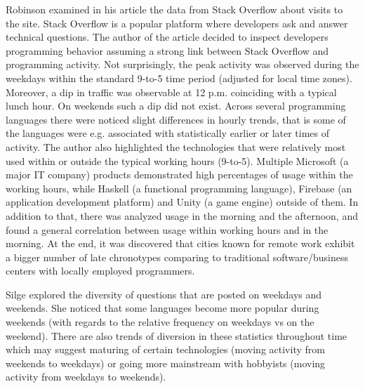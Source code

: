 
Robinson \cite{Rob17LangsUsedAtNight} examined in his article the data from Stack Overflow about visits to the site. Stack Overflow is a popular platform where developers ask and answer technical questions. The author of the article decided to inspect developers programming behavior assuming a strong link between Stack Overflow and programming activity. Not surprisingly, the peak activity was observed during the weekdays within the standard 9-to-5 time period (adjusted for local time zones). Moreover, a dip in traffic was observable at 12 p.m. coinciding with a typical lunch hour. On weekends such a dip did not exist. Across several programming languages there were noticed slight differences in hourly trends, that is some of the languages were e.g. associated with statistically earlier or later times of activity. The author also highlighted the technologies that were relatively most used within or outside the typical working hours (9-to-5). Multiple Microsoft (a major IT company) products demonstrated high percentages of usage within the working hours, while Haskell (a functional programming language), Firebase (an application development platform) and Unity (a game engine) outside of them. In addition to that, there was analyzed usage in the morning and the afternoon, and found a general correlation between usage within working hours and in the morning. At the end, it was discovered that cities known for remote work exhibit a bigger number of late chronotypes comparing to traditional software/business centers with locally employed programmers.

Silge \cite{Sil17LangsUsedOnWeekends} explored the diversity of questions that are posted on weekdays and weekends. She noticed that some languages become more popular during weekends (with regards to the relative frequency on weekdays vs on the weekend). There are also trends of diversion in these statistics throughout time which may suggest maturing of certain technologies (moving activity from weekends to weekdays) or going more mainstream with hobbyists (moving activity from weekdays to weekends).
